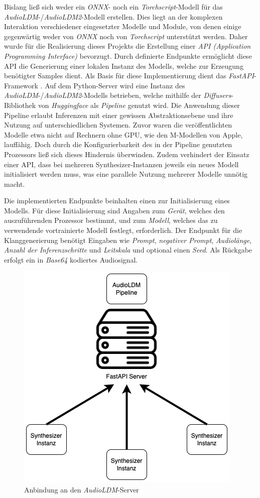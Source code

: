 \documentclass[
  a4paper,  %
  twoside,  %
  bibliography=totoc,
  headsepline,
  cleardoublepage=empty,
  parskip=half,
  draft=false
]{scrbook}
\begin{document}
{Bislang ließ sich weder ein \emph{ONNX}- noch ein \emph{Torchscript}-Modell für das \emph{AudioLDM}-/\emph{AudioLDM2}-Modell erstellen. Dies liegt an der komplexen Interaktion verschiedener eingesetzter Modelle und Module, von denen einige gegenwärtig weder von \emph{ONNX} noch von \emph{Torchscript} unterstützt werden. Daher wurde für die Realisierung dieses Projekts die Erstellung einer \emph{API (Application Programming Interface)} bevorzugt. Durch definierte Endpunkte ermöglicht diese API die Generierung einer lokalen Instanz des Modells, welche zur Erzeugung benötigter Samples dient. Als Basis für diese Implementierung dient das \emph{FastAPI}-Framework \cite{noauthor_fastapi_nodate}. Auf dem Python-Server wird eine Instanz des \emph{AudioLDM}-/\emph{AudioLDM2}-Modells betrieben, welche mithilfe der \emph{Diffusers}-Bibliothek \cite{von_platen_diffusers_2023} von \emph{Huggingface} \cite{noauthor_hugging_2023} als \emph{Pipeline} \cite{noauthor_huggingface-audioldm_nodate, noauthor_huggingface-audioldm2_nodate} genutzt wird. Die Anwendung dieser Pipeline erlaubt Inferenzen mit einer gewissen Abstraktionsebene und ihre Nutzung auf unterschiedlichen Systemen. Zuvor waren die veröffentlichten Modelle etwa nicht auf Rechnern ohne GPU, wie den M-Modellen von Apple, lauffähig. Doch durch die Konfigurierbarkeit des in der Pipeline genutzten Prozessors ließ sich dieses Hindernis überwinden. Zudem verhindert der Einsatz einer API, dass bei mehreren Synthesizer-Instanzen jeweils ein neues Modell initialisiert werden muss, was eine parallele Nutzung mehrerer Modelle unnötig macht.

Die implementierten Endpunkte beinhalten einen zur Initialisierung eines Modells. Für diese Initialisierung sind Angaben zum \emph{Gerät}, welches den auszuführenden Prozessor bestimmt, und zum \emph{Modell}, welches das zu verwendende vortrainierte Modell festlegt, erforderlich. Der Endpunkt für die Klanggenerierung benötigt Eingaben wie \emph{Prompt}, \emph{negativer Prompt}, \emph{Audiolänge}, \emph{Anzahl der Inferenzschritte} und \emph{Leitskala} und optional einen \emph{Seed}. Als Rückgabe erfolgt ein in \emph{Base64} kodiertes Audiosignal.

\begin{figure}
  \centering
  \includegraphics[width=.4\textwidth]{graphics/Server.png}
  \caption[AudiLDM Anbindung]{Anbindung an den \emph{AudioLDM}-Server}
  \label{fig:server}
\end{figure}

}
\end{document}

